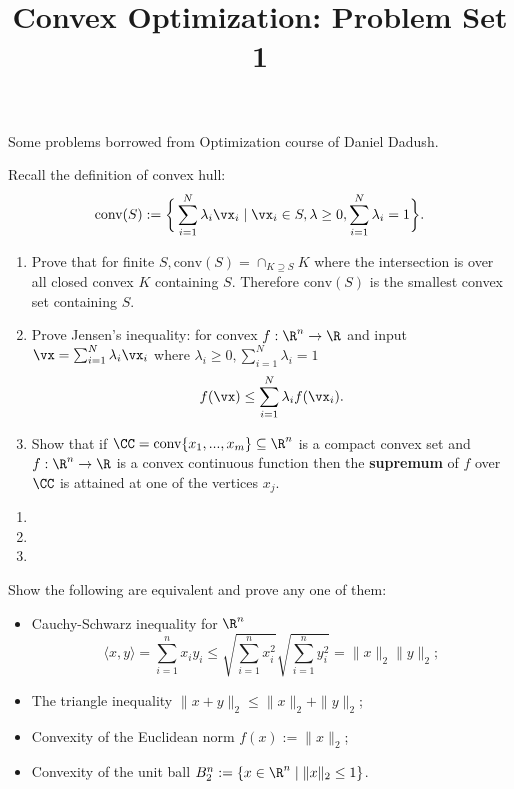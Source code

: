 \documentclass[addpoints,12pt,A4]{exam}
\title{Convex Optimization: Problem Set 1}
\begin{document}
\maketitle

Some problems borrowed from Optimization course of Daniel Dadush. 

\begin{questions}


 \question
Recall the definition of convex hull:
\[ \text{conv}(S) := \bigg\{ \sum_{i=1}^{N} \lambda_{i} \vx_{i} \mid \vx_{i} \in S, \lambda \geq 0, \sum_{i=1}^{N} \lambda_{i} = 1 \bigg\} . \]
 
 \begin{enumerate}
 \item Prove that for finite $S, \text{conv}(S) = \cap_{K \supseteq S} K$ where the intersection is over all closed convex $K$ containing $S$. Therefore $\text{conv}(S)$ is the smallest convex set containing $S$. 

 \item Prove Jensen's inequality: for convex $f : \R^{n} \to \R$ and input $\vx = \sum_{i=1}^{N} \lambda_{i} \vx_{i}$ where $\lambda_{i} \geq 0, \sum_{i=1}^{N} \lambda_{i} = 1$
 \[ f(\vx) \leq \sum_{i=1}^{N} \lambda_{i} f(\vx_{i}) .   \]

 \item Show that if $\CC = \text{conv}\{x_{1}, ..., x_{m}\} \subseteq\R^n$ is a compact convex set and $f:\R^n\to\R$ is a convex continuous function then the {\bf supremum} of $f$ over $\CC$ is attained at one of the vertices $x_{j}$. 
 \end{enumerate}

  \begin{solution}
  \begin{enumerate}
      \item 
      \item 
      \item 
  \end{enumerate}
  \end{solution}


  \question
  Show the following are equivalent and prove any one of them:
  \begin{itemize}
      \item[(a)] Cauchy-Schwarz inequality for $\R^{n}$
      \[ \langle x, y \rangle = \sum_{i=1}^{n} x_{i} y_{i} \leq \sqrt{ \sum_{i=1}^{n} x_{i}^{2}} \sqrt{\sum_{i=1}^{n} y_{i}^{2}} = \|x\|_{2} \|y\|_{2} ;  \]
      \item[(b)] The triangle inequality $\|x+y\|_{2} \leq \|x\|_{2} + \|y\|_{2}$;
      \item[(c)] Convexity of the Euclidean norm $f(x) := \|x\|_{2}$;
      \item[(d)] Convexity of the unit ball $B_{2}^{n} := \{ x \in \R^{n} \mid \|x\|_{2} \leq 1 \}$.
  \end{itemize}


\end{questions}
\end{document}
